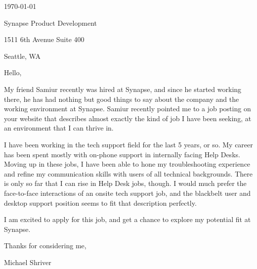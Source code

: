 \documentclass[10pt,oneside]{article}
\begin{document}
\hfill\dte\today
\heading
\vspace{\baselineskip}

Synapse Product Development

1511 6th Avenue Suite 400

Seattle, WA

\vspace{\baselineskip}
\vspace{\baselineskip}

Hello,

\vspace{\baselineskip}

My friend Samiur recently was hired at Synapse, and since he started working there, he has had nothing but good things to say about the company and the working environment at Synapse. Samiur recently pointed me to a job posting on your website that describes almost exactly the kind of job I have been seeking, at an environment that I can thrive in.

\vspace{\baselineskip}

I have been working in the tech support field for the last 5 years, or so. My career has been spent mostly with on-phone support in internally facing Help Desks. Moving up in these jobs, I have been able to hone my troubleshooting experience and refine my communication skills with users of all technical backgrounds. There is only so far that I can rise in Help Desk jobs, though. I would much prefer the face-to-face interactions of an onsite tech support job, and the blackbelt user and desktop support position seems to fit that description perfectly.

\vspace{\baselineskip}

I am excited to apply for this job, and get a chance to explore my potential fit at Synapse.

\vspace{\baselineskip}

Thanks for considering me,

\vspace{\baselineskip}

Michael Shriver
\end{document}
